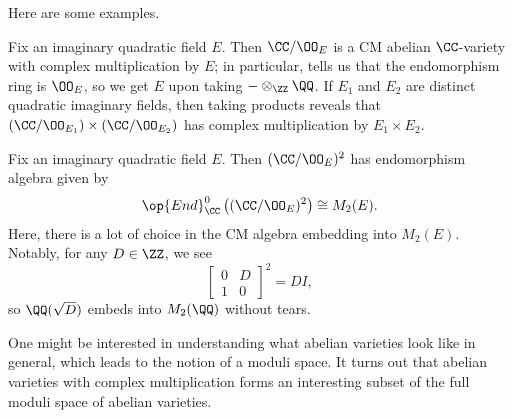 \documentclass[../notes.tex]{subfiles}
\begin{document}
Here are some examples.
\begin{example}
	Fix an imaginary quadratic field $E$. Then $\CC/\OO_E$ is a CM abelian $\CC$-variety with complex multiplication by $E$; in particular,  tells us that the endomorphism ring is $\OO_E$, so we get $E$ upon taking $-\otimes_\ZZ\QQ$. If $E_1$ and $E_2$ are distinct quadratic imaginary fields, then taking products reveals that $(\CC/\OO_{E_1})\times(\CC/\OO_{E_2})$ has complex multiplication by $E_1\times E_2$.
\end{example}
\begin{example}
	Fix an imaginary quadratic field $E$. Then $(\CC/\OO_E)^2$ has endomorphism algebra given by
	\[\op{End}^0_\CC\left((\CC/\OO_E)^2\right)\cong M_2(E).\]
	Here, there is a lot of choice in the CM algebra embedding into $M_2(E)$. Notably, for any $D\in\ZZ$, we see
	\[\begin{bmatrix}
		0 & D \\
		1 & 0
	\end{bmatrix}^2=DI,\]
	so $\QQ(\sqrt D)$ embeds into $M_2(\QQ)$ without tears.
\end{example}
\begin{remark}
	One might be interested in understanding what abelian varieties look like in general, which leads to the notion of a moduli space. It turns out that abelian varieties with complex multiplication forms an interesting subset of the full moduli space of abelian varieties.
\end{remark}
\end{document}
